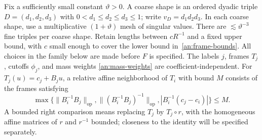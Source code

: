 \documentclass[11pt]{amsart}
\theoremstyle{definition}
\theoremstyle{remark}
\numberwithin{equation}{section}
\begin{document}
Fix a sufficiently small constant $\vartheta>0$. A coarse shape is an ordered dyadic triple $D=(d_1,d_2,d_3)$ with $0<d_1\le d_2\le d_3\le1$; write $v_D=d_1d_2d_3$. In each coarse shape, use a multiplicative $(1+\vartheta)$ mesh of singular values. There are $\lesssim\vartheta^{-3}$ fine triples per coarse shape. Retain lengths between $cR^{-1}$ and a fixed upper bound, with $c$ small enough to cover the lower bound in~\eqref{an:frame-bounds}. All choices in the family below are made before $F$ is specified. The labels $j$, frames $T_j$, cutoffs $\phi_j$, and mass weights \eqref{an:mass-weights} are coefficient-independent. For $T_j(u)=c_j+B_ju$, a relative affine neighborhood of $T_i$ with bound $M$ consists of the frames satisfying
\[
\max\{\|B_i^{-1}B_j\|_{\mathrm{op}},\|(B_i^{-1}B_j)^{-1}\|_{\mathrm{op}},|B_i^{-1}(c_j-c_i)|\}\le M.
\]
A bounded right comparison means replacing $T_j$ by $T_j\circ r$, with the homogeneous affine matrices of $r$ and $r^{-1}$ bounded; closeness to the identity will be specified separately.
\end{document}
